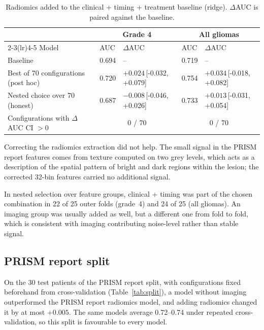 \documentclass[11pt,a4paper]{article}
\newcommand{\ci}[2]{\,[#1,\,#2]}
\begin{document}
\begin{table}[h]
\centering
\caption{Radiomics added to the clinical + timing + treatment baseline (ridge). $\Delta$AUC is paired against the
baseline.}
\label{tab:c3}
\footnotesize
\begin{tabular}{lllll}
\toprule
& \multicolumn{2}{c}{Grade 4} & \multicolumn{2}{c}{All gliomas} \\
\cmidrule(lr){2-3}\cmidrule(lr){4-5}
Model & AUC & $\Delta$AUC & AUC & $\Delta$AUC \\
\midrule
Baseline & 0.694 & -- & 0.719 & -- \\
Best of 70 configurations (post hoc) & 0.720 & $+0.024$\ci{-0.032}{+0.079} & 0.754 & $+0.034$\ci{-0.018}{+0.082} \\
Nested choice over 70 (honest) & 0.687 & $-0.008$\ci{-0.046}{+0.026} & 0.733 & $+0.013$\ci{-0.031}{+0.054} \\
\midrule
Configurations with $\Delta$AUC CI $> 0$ & \multicolumn{2}{c}{0 / 70} & \multicolumn{2}{c}{0 / 70} \\
\bottomrule
\end{tabular}
\end{table}

Correcting the radiomics extraction did not help. The small signal in the PRISM report features comes from texture
computed on two grey levels, which acts as a description of the spatial pattern of bright and dark regions within the
lesion; the corrected 32-bin features carried no additional signal.

In nested selection over feature groups, clinical + timing was part of the chosen combination in 22 of 25 outer folds
(grade~4) and 24 of 25 (all gliomas). An imaging group was usually added as well, but a different one from fold to
fold, which is consistent with imaging contributing noise-level rather than stable signal.

\subsection{PRISM report split}
On the 30 test patients of the PRISM report split, with configurations fixed beforehand from cross-validation
(Table~\ref{tab:split}), a model without imaging outperformed the PRISM report radiomics model, and adding radiomics
changed it by at most $+0.005$. The same models average 0.72--0.74 under repeated cross-validation, so this split is
favourable to every model.
\end{document}
